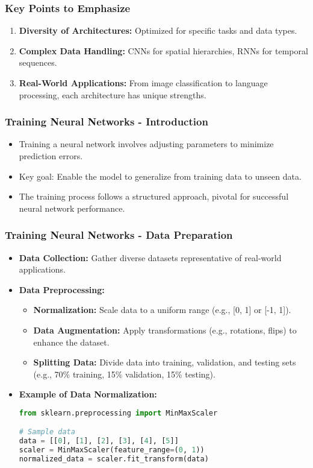 \documentclass[aspectratio=169]{beamer}
\begin{document}
\begin{frame}[fragile]
    \frametitle{Key Points to Emphasize}
    \begin{enumerate}
        \item \textbf{Diversity of Architectures:} Optimized for specific tasks and data types.
        \item \textbf{Complex Data Handling:} CNNs for spatial hierarchies, RNNs for temporal sequences.
        \item \textbf{Real-World Applications:} From image classification to language processing, each architecture has unique strengths.
    \end{enumerate}
\end{frame}

\begin{frame}[fragile]
    \frametitle{Training Neural Networks - Introduction}
    \begin{itemize}
        \item Training a neural network involves adjusting parameters to minimize prediction errors.
        \item Key goal: Enable the model to generalize from training data to unseen data.
        \item The training process follows a structured approach, pivotal for successful neural network performance.
    \end{itemize}
\end{frame}

\begin{frame}[fragile]
    \frametitle{Training Neural Networks - Data Preparation}
    \begin{itemize}
        \item \textbf{Data Collection:} Gather diverse datasets representative of real-world applications.
        \item \textbf{Data Preprocessing:}
            \begin{itemize}
                \item \textbf{Normalization:} Scale data to a uniform range (e.g., [0, 1] or [-1, 1]).
                \item \textbf{Data Augmentation:} Apply transformations (e.g., rotations, flips) to enhance the dataset.
                \item \textbf{Splitting Data:} Divide data into training, validation, and testing sets (e.g., 70\% training, 15\% validation, 15\% testing).
            \end{itemize}
        \item \textbf{Example of Data Normalization:}
        \begin{lstlisting}[language=Python]
from sklearn.preprocessing import MinMaxScaler

# Sample data
data = [[0], [1], [2], [3], [4], [5]]
scaler = MinMaxScaler(feature_range=(0, 1))
normalized_data = scaler.fit_transform(data)
        \end{lstlisting}
    \end{itemize}
\end{frame}
\end{document}
